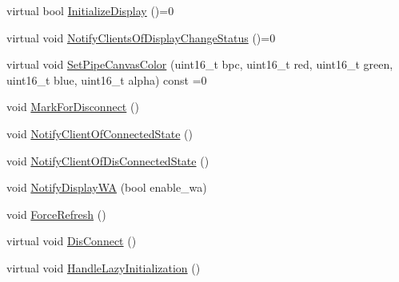 \begin{DoxyCompactItemize}
virtual bool \mbox{\hyperlink{classhwcomposer_1_1PhysicalDisplay_a1800b4ee66d4ec790d661106564b6fca}{Initialize\+Display}} ()=0
\item 
virtual void \mbox{\hyperlink{classhwcomposer_1_1PhysicalDisplay_aefba7f9543d7ef74d42f9e06dd0f1a58}{Notify\+Clients\+Of\+Display\+Change\+Status}} ()=0
\item 
virtual void \mbox{\hyperlink{classhwcomposer_1_1PhysicalDisplay_a3aeed39dd1af137ed16d83c4dfdcafad}{Set\+Pipe\+Canvas\+Color}} (uint16\+\_\+t bpc, uint16\+\_\+t red, uint16\+\_\+t green, uint16\+\_\+t blue, uint16\+\_\+t alpha) const =0
\item 
void \mbox{\hyperlink{classhwcomposer_1_1PhysicalDisplay_a4ef2dfb7a531523ca92c33acf5d86992}{Mark\+For\+Disconnect}} ()
\item 
void \mbox{\hyperlink{classhwcomposer_1_1PhysicalDisplay_a2bc69ef05899f3079fc48c9fd2907ee0}{Notify\+Client\+Of\+Connected\+State}} ()
\item 
void \mbox{\hyperlink{classhwcomposer_1_1PhysicalDisplay_a59fb1c1042c6c83e8b1515d27f110e6e}{Notify\+Client\+Of\+Dis\+Connected\+State}} ()
\item 
void \mbox{\hyperlink{classhwcomposer_1_1PhysicalDisplay_ac1fb0f67cead30c43f410e7216f08f9e}{Notify\+Display\+WA}} (bool enable\+\_\+wa)
\item 
void \mbox{\hyperlink{classhwcomposer_1_1PhysicalDisplay_a14d33c040470fbd1bc3de5bd67c5ae73}{Force\+Refresh}} ()
\item 
virtual void \mbox{\hyperlink{classhwcomposer_1_1PhysicalDisplay_ad219e79a0c40b94e3cb5f52ad60990f2}{Dis\+Connect}} ()
\item 
virtual void \mbox{\hyperlink{classhwcomposer_1_1PhysicalDisplay_ab8e24e90adf5eaa76da5cb827ad82c65}{Handle\+Lazy\+Initialization}} ()
\end{DoxyCompactItemize}
